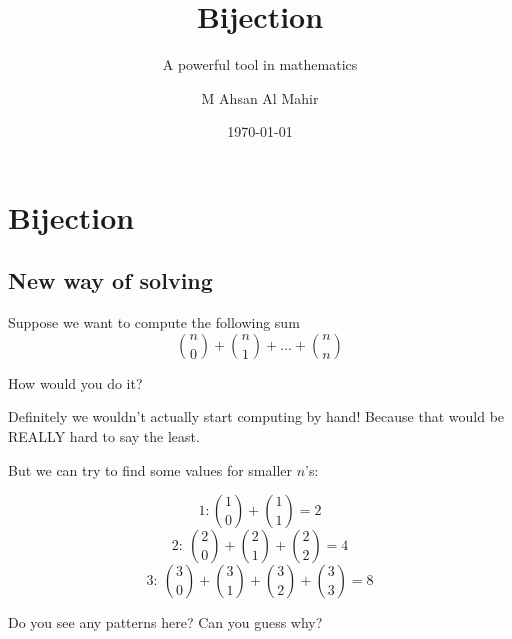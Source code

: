 \documentclass[compress]{beamer}
\title{Bijection}
\subtitle{A powerful tool in mathematics}
\author{M Ahsan Al Mahir}
\date{\today}
\begin{document}
\begin{frame}
    \maketitle
\end{frame}


\section{Bijection}

\subsection{New way of solving}

\begin{frame}
    \textcolor{NordOrange}{Suppose we want to compute the following sum
    \[{n \choose 0}+{n \choose 1} + \dots  + {n \choose n}\] }
    
    How would you do it?

    \pause \vspace{1em}

    Definitely we wouldn't actually start computing by hand! Because that
    would be \textcolor{NordRed}{REALLY} hard to say the least.
\end{frame}

\begin{frame}
    But we can try to find some values for smaller $n$'s:
    \pause\vspace{1em}

    \[1: {1 \choose 0} + {1 \choose 1} = 2\]\pause
    \[2:\ {2 \choose 0} + {2 \choose 1} + {2 \choose 2} = 4\] \pause
    \[3:\ {3 \choose 0} + {3 \choose 1} + {3 \choose 2} + {3 \choose 3} = 8\] 

    \pause\vspace{1em}

    Do you see any patterns here? Can you guess why?
\end{frame}
\end{document}
